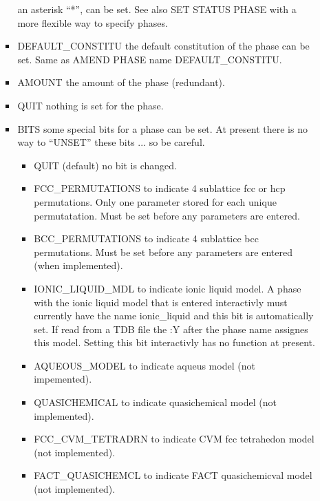\documentclass[12pt]{article}
\begin{document}
\begin{itemize}
\begin{itemize}
\begin{itemize}
      an asterisk ``*'', can be set.  See also SET STATUS PHASE
      with a more flexible way to specify phases.
    \item DEFAULT\_CONSTITU the default constitution of the phase can be
      set.  Same as AMEND PHASE name DEFAULT\_CONSTITU.
    \item AMOUNT the amount of the phase (redundant).
    \item QUIT nothing is set for the phase.
    \item BITS some special bits for a phase can be set.  At present
      there is no way to ``UNSET'' these bits ... so be careful.
      \begin{itemize}
      \item QUIT (default) no bit is changed.
      \item FCC\_PERMUTATIONS to indicate 4 sublattice fcc or hcp
        permutations.  Only one parameter stored for each unique
        permutatation.  Must be set before any parameters are entered.
      \item BCC\_PERMUTATIONS to indicate 4 sublattice bcc
        permutations.  Must be set before any parameters are entered
        (when implemented).
      \item IONIC\_LIQUID\_MDL to indicate ionic liquid model.  A
        phase with the ionic liquid model that is entered interactivly
        must currently have the name ionic\_liquid and this bit is
        automatically set.  If read from a TDB file the :Y after the
        phase name assignes this model.  Setting this bit interactivly
        has no function at present.
      \item AQUEOUS\_MODEL to indicate aqueus model (not impemented).
      \item QUASICHEMICAL to indicate quasichemical model (not implemented).
      \item FCC\_CVM\_TETRADRN to indicate CVM fcc tetrahedon model (not
        implemented).
      \item FACT\_QUASICHEMCL to indicate FACT quasichemicval model (not
        implemented).

\end{itemize}
\end{itemize}
\end{itemize}
\end{itemize}
\end{document}
